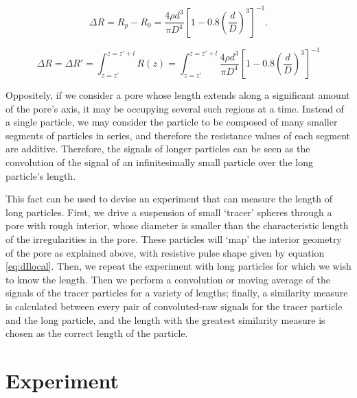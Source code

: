 		\begin{equation}\label{eq:dIlocal}
			\Delta R=R_{p}-R_{0}=\frac{4\rho d^{3}}{\pi D^{4}}\left[1-0.8\left(\frac{d}{D}\right)^{3}\right]^{-1}.
		\end{equation}

		
		\begin{equation}\label{eq:theoreticalmovingaverage}
			\Delta R=\Delta R'=\int_{z=z'}^{z=z'+l}R\left(z\right)=\int_{z=z'}^{z=z'+l}\frac{4\rho d^{3}}{\pi D^{4}}\left[1-0.8\left(\frac{d}{D}\right)^{3}\right]^{-1}
		\end{equation}

		
		Oppositely, if we consider a pore whose length extends along a significant amount of the pore's axis, it may be occupying several such regions at a time. Instead of a single particle, we may consider the particle to be composed of many smaller segments of particles in series, and therefore the resistance values of each segment are additive. Therefore, the signals of longer particles can be seen as the convolution of the signal of an infinitesimally small particle over the long particle's length. 
		
		This fact can be used to devise an experiment that can measure the length of long particles. First, we drive a suspension of small `tracer' spheres through a pore with rough interior, whose diameter is smaller than the characteristic length of the irregularities in the pore. These particles will `map' the interior geometry of the pore as explained above, with resistive pulse shape given by equation \ref{eq:dIlocal}. Then, we repeat the experiment with long particles for which we wish to know the length. Then we perform a convolution or moving average of the signals of the tracer particles for a variety of lengths; finally, a similarity measure is calculated between every pair of convoluted-raw signals for the tracer particle and the long particle, and the length with the greatest similarity measure is chosen as the correct length of the particle. 
		
	\section{Experiment}
	    
